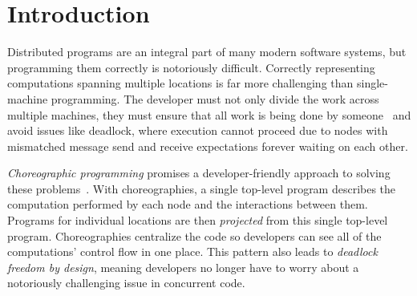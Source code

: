 \section{Introduction}
\label{sec:introduction}

Distributed programs are an integral part of many modern software systems, but programming them correctly is notoriously difficult.
Correctly representing computations spanning multiple locations is far more challenging than single-machine programming.
The developer must not only divide the work across multiple machines, they must ensure that all work is being done by someone~ 
and avoid issues like deadlock, where execution cannot proceed due to nodes with mismatched message send and receive expectations forever waiting on each other.


\emph{Choreographic programming} promises a developer-friendly approach to solving these problems~\citep{Montesi22,Montesi13}.
With choreographies, a single top-level program describes the computation performed by each node and the interactions between them.
Programs for individual locations are then \emph{projected} from this single top-level program.
 
Choreographies centralize the code so developers can see all of the computations' control flow in one place.
This pattern also leads to \emph{deadlock freedom by design}, meaning developers no longer have to worry about a notoriously challenging issue in concurrent code.


